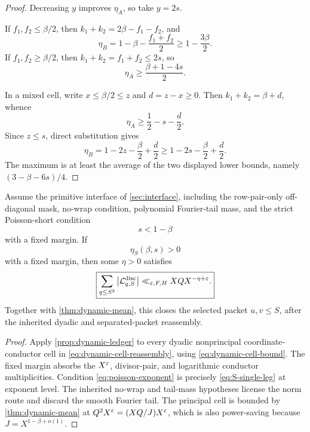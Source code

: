 \begin{proof}
Decreasing \(y\) improves \(\eta_A\), so take \(y=2s\).

If \(f_1,f_2\le\beta/2\), then
\(k_1+k_2=2\beta-f_1-f_2\), and
\[
 \eta_B=1-\beta-\frac{f_1+f_2}{2}
 \ge1-\frac{3\beta}{2}.
\]
If \(f_1,f_2\ge\beta/2\), then
\(k_1+k_2=f_1+f_2\le2s\), so
\[
 \eta_A\ge\frac{\beta+1-4s}{2}.
\]

In a mixed cell, write
\(x\le\beta/2\le z\) and \(d=z-x\ge0\).  Then
\(k_1+k_2=\beta+d\), whence
\begin{equation}
 \eta_A\ge\frac12-s-\frac d2.
 \label{eq:mixed-A}
\end{equation}
Since \(z\le s\), direct substitution gives
\begin{equation}
 \eta_B=1-2z-\frac\beta2+\frac d2
 \ge1-2s-\frac\beta2+\frac d2.
 \label{eq:mixed-B}
\end{equation}
The maximum is at least the average of the two displayed lower bounds,
namely \((3-\beta-6s)/4\).
\end{proof}

\begin{theorem}
\label{thm:dynamic-closure}
Assume the primitive interface of \cref{sec:interface}, including the
row-pair-only off-diagonal mask, no-wrap condition, polynomial
Fourier-tail mass, and the strict Poisson-short condition
\begin{equation}
 s<1-\beta
 \label{eq:poisson-exponent}
\end{equation}
with a fixed margin.  If
\begin{equation}
 \eta_S(\beta,s)>0
 \label{eq:hybrid-positive}
\end{equation}
with a fixed margin, then some \(\eta>0\) satisfies
\begin{equation}
 \boxed{
 \sum_{q\le S^2}
 \left|\mathcal L_{q,S}^{\rm disc}\right|
 \ll_{\varepsilon,F,H}XQX^{-\eta+\varepsilon}.}
 \label{eq:dynamic-discrepancy-closure}
\end{equation}
Together with \cref{thm:dynamic-mean}, this closes the selected packet
\(u,v\le S\), after the inherited dyadic and separated-packet
reassembly.
\end{theorem}

\begin{proof}
Apply \cref{prop:dynamic-ledger} to every dyadic nonprincipal
coordinate-conductor cell in \eqref{eq:dynamic-cell-reassembly}, using
\eqref{eq:dynamic-cell-bound}.  The fixed
margin absorbs the \(X^\varepsilon\), divisor-pair, and logarithmic conductor
multiplicities.  Condition \eqref{eq:poisson-exponent} is precisely
\eqref{eq:S-single-leg} at exponent level.  The inherited no-wrap and
tail-mass hypotheses license the norm route and discard the smooth
Fourier tail.  The principal cell is bounded by
\cref{thm:dynamic-mean} at \(Q^2X^\varepsilon=(XQ/J)X^\varepsilon\), which is also
power-saving because \(J=X^{1-\beta+o(1)}\).
\end{proof}

